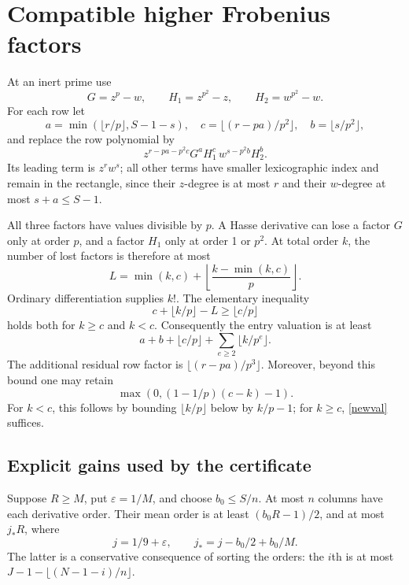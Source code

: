 \documentclass[11pt]{article}
\begin{document}
\section{Compatible higher Frobenius factors}\label{frobenius}
At an inert prime use
\[
 G=z^p-w,\qquad H_1=z^{p^2}-z,\qquad H_2=w^{p^2}-w.
\]
For each row let
\[
 a=\min(\lfloor r/p\rfloor,S-1-s),\quad
 c=\lfloor(r-pa)/p^2\rfloor,\quad b=\lfloor s/p^2\rfloor,
\]
and replace the row polynomial by
\begin{equation}\label{threefactor}
 z^{r-pa-p^2c}G^aH_1^c\,w^{s-p^2b}H_2^b.
\end{equation}
Its leading term is \(z^rw^s\); all other terms have smaller
lexicographic index and remain in the rectangle, since their
\(z\)-degree is at most \(r\) and their \(w\)-degree at most
\(s+a\le S-1\).

All three factors have values divisible by \(p\). A Hasse derivative
can lose a factor \(G\) only at order \(p\), and a factor \(H_1\)
only at order 1 or \(p^2\). At total order \(k\), the number of lost
factors is therefore at most
\[
 L=\min(k,c)+\left\lfloor\frac{k-\min(k,c)}p\right\rfloor.
\]
Ordinary differentiation supplies \(k!\). The elementary inequality
\[
 c+\lfloor k/p\rfloor-L\ge\lfloor c/p\rfloor
\]
holds both for \(k\ge c\) and \(k<c\). Consequently the entry
valuation is at least
\begin{equation}\label{newval}
 a+b+\lfloor c/p\rfloor+\sum_{e\ge2}\lfloor k/p^e\rfloor.
\end{equation}
The additional residual row factor is
\(\lfloor(r-pa)/p^3\rfloor\). Moreover, beyond this bound one may
retain
\begin{equation}\label{coupled-entry}
 \max\left(0,(1-1/p)(c-k)-1\right).
\end{equation}
For \(k<c\), this follows by bounding \(\lfloor k/p\rfloor\)
below by \(k/p-1\); for \(k\ge c\), \eqref{newval} suffices.

\subsection{Explicit gains used by the certificate}
Suppose \(R\ge M\), put \(\varepsilon=1/M\), and choose
\(b_0\le S/n\). At most \(n\) columns have each derivative order.
Their mean order is at least \((b_0R-1)/2\), and at most \(j_*R\),
where
\begin{equation}\label{jstar}
 j=1/9+\varepsilon,\qquad j_*=j-b_0/2+b_0/M.
\end{equation}
The latter is a conservative consequence of sorting the orders:
the \(i\)th is at most \(J-1-\lfloor(N-1-i)/n\rfloor\).
\end{document}
